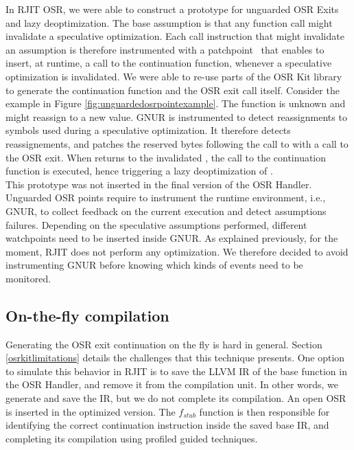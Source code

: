 In RJIT OSR, we were able to construct a prototype for unguarded OSR Exits and lazy deoptimization.
The base assumption is that any function call might invalidate a speculative optimization.
Each call instruction that might invalidate an assumption is therefore instrumented with a patchpoint~\cite{llvmPatchpoints} that enables to insert, at runtime, a call to the continuation function, whenever a speculative optimization is invalidated.
We were able to re-use parts of the OSR Kit library to generate the continuation function and the OSR exit call itself.
Consider the example in Figure \ref{fig:unguardedosrpointexample}.
The function  is unknown and might reassign  to a new value.
GNUR is instrumented to detect reassignments to symbols used during a speculative optimization.
It therefore detects  reassignements, and patches the reserved bytes following the call to  with a call to the OSR exit.
When  returns to the invalidated , the call to the continuation function is executed, hence triggering a lazy deoptimization of .\\

This prototype was not inserted in the final version of the OSR Handler.
Unguarded OSR points require to instrument the runtime environment, i.e., GNUR, to collect feedback on the current execution and detect assumptions failures.
Depending on the speculative assumptions performed, different watchpoints need to be inserted inside GNUR.
As explained previously, for the moment, RJIT does not perform any optimization. 
We therefore decided to avoid instrumenting GNUR before knowing which kinds of events need to be monitored.\\

\subsection{On-the-fly compilation}

Generating the OSR exit continuation on the fly is hard in general. 
Section \ref{osrkitlimitations} details the challenges that this technique presents.
One option to simulate this behavior in RJIT is to save the LLVM IR of the base function in the OSR Handler, and remove it from the compilation unit.
In other words, we generate and save the IR, but we do not complete its compilation.
An open OSR is inserted in the optimized version. 
The $f_{stub}$ function is then responsible for identifying the correct continuation instruction inside the saved base IR, and completing its compilation using profiled guided techniques.\\

